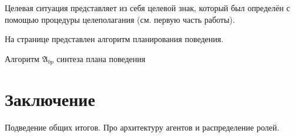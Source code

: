 \documentclass[a4paper, 12pt]{article}
\theoremstyle{plain}
\newcommand{\stretchsize}{2}
\renewcommand{\baselinestretch}{\stretchsize}
\begin{document}
	
	Целевая ситуация представляет из себя целевой знак, который был определён с помощью процедуры целеполагания (см. первую часть работы).
	
	На странице \pageref{alg:beh_plan} представлен алгоритм планирования поведения.
	\renewcommand{\baselinestretch}{1}	
	\begin{algorithm}[h]
		\caption{Алгоритм $\mathfrak{A}_{bp}$ синтеза плана поведения}\label{alg:beh_plan}
		\begin{algorithmic}[1]
			
		\end{algorithmic}
	\end{algorithm}
	\renewcommand{\baselinestretch}{\stretchsize}	

	\section*{Заключение} Подведение общих итогов. Про архитектуру агентов и распределение ролей.
	
	
	
	
\end{document}

